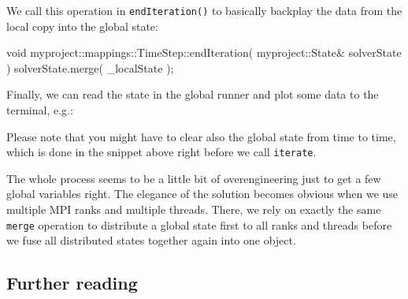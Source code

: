 \noindent
We call this operation in \texttt{endIteration()} to basically backplay the data
from the local copy into the global state:
\begin{code}
void myproject::mappings::TimeStep::endIteration(
  myproject::State&  solverState
) {
  solverState.merge( _localState );
}
\end{code}

\noindent
Finally, we can read the state in the global runner and plot some data to the
terminal, e.g.:

\noindent
Please note that you might have to clear also the global state from time to
time, which is done in the snippet above right before we call \texttt{iterate}.

\begin{remark}
  The whole process seems to be a little bit of overengineering just to get a
  few global variables right. The elegance of the solution becomes obvious when
  we use multiple MPI ranks and multiple threads. There, we rely on exactly the
  same \texttt{merge} operation to distribute a global state first to all ranks
  and threads before we fuse all distributed states together again into one
  object. 
\end{remark}






\subsection*{Further reading}

